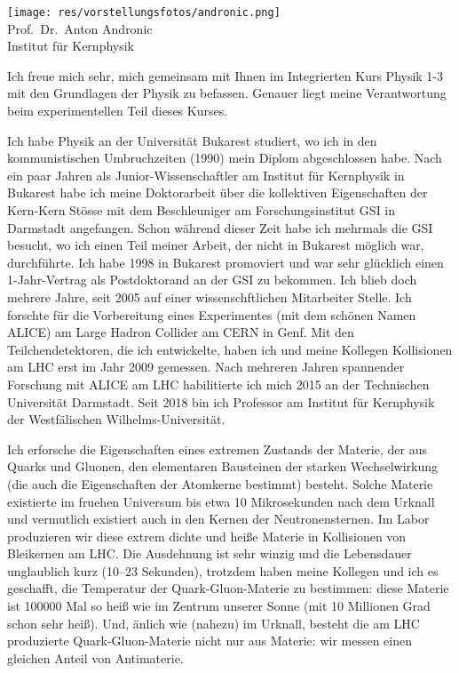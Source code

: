 \begin{center}
\end{center}

\newpage

\vspace*{\fill}

\begin{multicols}{2}
\begin{center}
\texttt{[image: res/vorstellungsfotos/andronic.png]}\\
\smallskip
Prof.\ Dr.\ Anton Andronic\\
Institut für Kernphysik
\end{center}

Ich freue mich sehr, mich gemeinsam mit Ihnen im Integrierten Kurs Physik 1-3 mit den Grundlagen der Physik zu befassen. Genauer liegt meine Verantwortung beim experimentellen Teil dieses Kurses.

Ich habe Physik an der Universität Bukarest studiert, wo ich in den kommunistischen Umbruchzeiten (1990) mein Diplom abgeschlossen habe. Nach ein paar Jahren als Junior-Wissenschaftler am Institut für Kernphysik in Bukarest habe ich meine Doktorarbeit über die kollektiven Eigenschaften der Kern-Kern Stösse mit dem Beschleuniger am Forschungsinstitut GSI in Darmstadt angefangen. Schon
während dieser Zeit habe ich mehrmals die GSI besucht, wo ich einen Teil meiner Arbeit, der nicht in Bukarest möglich war, durchführte. Ich habe 1998 in Bukarest promoviert und war sehr glücklich einen 1-Jahr-Vertrag als Postdoktorand an der GSI zu bekommen. Ich blieb doch mehrere Jahre, seit 2005 auf einer wissenschftlichen Mitarbeiter Stelle. Ich forschte für die Vorbereitung eines Experimentes (mit dem schönen Namen ALICE) am Large Hadron Collider am CERN in Genf. Mit den Teilchendetektoren, die ich entwickelte, haben ich und meine Kollegen Kollisionen am LHC erst im Jahr 2009 gemessen. Nach mehreren Jahren spannender Forschung mit ALICE am LHC habilitierte ich mich 2015 an der Technischen Universität Darmstadt. Seit 2018 bin ich Professor am Institut für Kernphysik der Westfälischen Wilhelms-Universität.

Ich erforsche die Eigenschaften eines extremen Zustands der Materie, der aus Quarks und Gluonen, den elementaren Bausteinen der starken Wechselwirkung (die auch die Eigenschaften der Atomkerne bestimmt) besteht. Solche Materie existierte im fruehen Universum bis etwa 10 Mikrosekunden nach dem Urknall und vermutlich existiert auch in den Kernen der Neutronensternen. Im Labor produzieren wir diese extrem dichte und heiße Materie in Kollisionen von Bleikernen am LHC. Die Ausdehnung ist sehr winzig und die Lebensdauer unglaublich kurz (10--23 Sekunden), trotzdem haben meine Kollegen und ich es geschafft, die Temperatur der Quark-Gluon-Materie zu bestimmen: diese Materie ist 100000 Mal so heiß wie im
Zentrum unserer Sonne (mit 10 Millionen Grad schon sehr heiß). Und, änlich wie (nahezu) im Urknall, besteht die am LHC produzierte Quark-Gluon-Materie nicht nur aus Materie: wir messen einen gleichen Anteil von Antimaterie.


\end{multicols}
